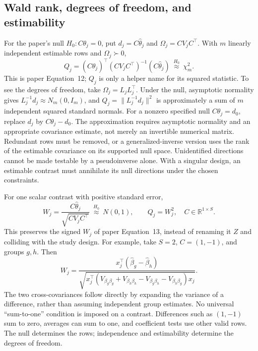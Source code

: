 \documentclass[11pt,a4paper]{article}
\newcommand{\R}{\mathbb R}
\numberwithin{equation}{section}
\begin{document}
\subsection{Wald rank, degrees of freedom, and estimability}
For the paper's null $H_0:C\theta_j=0$, put
$d_j=C\widehat\theta_j$ and $\Omega_j=C V_j C^\top$.
With $m$ linearly independent estimable rows and $\Omega_j\succ0$,
\begin{equation}
 Q_j=(C\widehat\theta_j)^\top(C V_j C^\top)^{-1}
          (C\widehat\theta_j)
       \ \overset{H_0}{\approx}\ \chi_m^2 .
 \label{eq:wald}
\end{equation}
This is paper Equation~12; $Q_j$ is only a helper name for its
squared statistic. To see the degrees of freedom, take
$\Omega_j=L_jL_j^\top$. Under the null, asymptotic normality gives
$L_j^{-1}d_j\approx N_m(0,I_m)$, and
$Q_j=\|L_j^{-1}d_j\|^2$ is approximately a sum of $m$ independent
squared standard normals.
For a nonzero specified null $C\theta_j=d_0$, replace $d_j$
by $C\widehat\theta_j-d_0$.
The approximation requires asymptotic normality and an appropriate
covariance estimate, not merely an invertible numerical matrix.
Redundant rows must be removed, or a generalized-inverse version uses
the rank of the estimable covariance on its supported null space.
Unidentified directions cannot be made testable by a pseudoinverse alone.
With a singular design, an estimable contrast must annihilate its null
directions under the chosen constraints.

For one scalar contrast with positive standard error,
\begin{equation}
 W_j=\frac{C\widehat\theta_j}{\sqrt{C V_j C^\top}}
      \ \overset{H_0}{\approx}\ N(0,1),\qquad Q_j=W_j^2,
 \quad C\in\R^{1\times S}.
\end{equation}
This preserves the signed $W_j$ of paper Equation~13, instead of
renaming it $Z$ and colliding with the study design.
For example, take $S=2$, $C=(1,-1)$, and groups $g,h$.
Then
\[
 W_j=
 \frac{x_j^\top(\widehat\beta_g-\widehat\beta_h)}
 {\sqrt{x_j^\top
 (V_{\beta_g\beta_g}+V_{\beta_h\beta_h}
     -V_{\beta_g\beta_h}-V_{\beta_h\beta_g})x_j}}.
\]
The two cross-covariances follow directly by expanding the variance
of a difference, rather than assuming independent group estimates.
No universal ``sum-to-one'' condition is imposed on a contrast.
Differences such as $(1,-1)$ sum to zero, averages can sum to one,
and coefficient tests use other valid rows. The null determines the rows;
independence and estimability determine the degrees of freedom.
\end{document}
